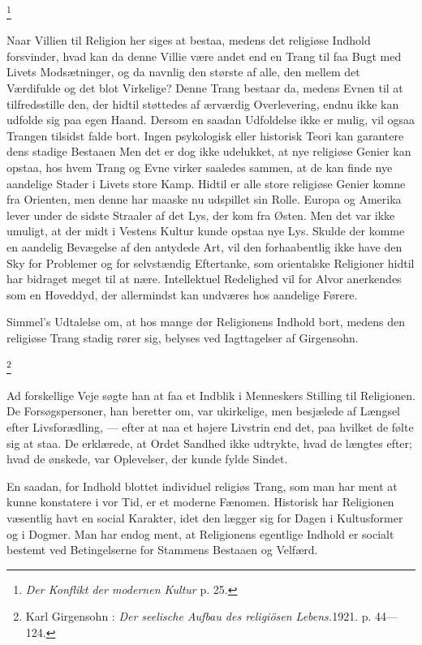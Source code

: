 \documentclass[12pt]{article}
\newcommand{\apage}[1]{\marginnote{\footnotesize\textit{[#1]}}}
\begin{document}
         \footnote{\textit{Der Konflikt der modernen Kultur} p. 25.}

       Naar Villien til Religion her siges at bestaa, medens det religiøse
Indhold forsvinder, hvad kan da denne Villie være andet end en Trang til faa
Bugt med Livets Modsætninger, og da navnlig den største af alle, den mellem det
Værdifulde og det blot Virkelige? Denne Trang bestaar da, medens Evnen til at
tilfredsstille den, der hidtil støttedes af ærværdig Overlevering, endnu ikke
kan udfolde sig paa egen Haand. Dersom en saadan Udfoldelse ikke er mulig, vil
ogsaa Trangen tilsidst falde bort. Ingen psykologisk eller historisk Teori kan
garantere dens stadige Bestaaen Men det er dog ikke udelukket, at nye religiøse
Genier kan opstaa, hos hvem Trang og Evne virker saaledes sammen, at de kan
finde nye aandelige Stader i Livets store Kamp. Hidtil er alle store religiøse
Genier komne fra Orienten, men denne har maaske nu udspillet sin Rolle. Europa
og Amerika lever under de sidste Straaler af det Lys, der kom fra Østen. Men
det var ikke umuligt, at der midt i Vestens Kultur kunde opstaa nye Lys. Skulde
der komme en aandelig Bevægelse af den antydede Art, vil den forhaabentlig ikke
have den Sky for Problemer og for selvstændig Eftertanke, som orientalske
Religioner hidtil har bidraget meget
\setcounter{footnote}{0}%
\apage{106}til at nære. Intellektuel Redelighed vil for Alvor anerkendes som en
Hoveddyd, der allermindst kan undværes hos aandelige Førere.

Simmel's Udtalelse om, at hos mange dør Religionens Indhold bort, medens den
religiøse Trang stadig rører sig, belyses ved Iagttagelser af Girgensohn.

         \footnote{Karl Girgensohn : \textit{Der seelische Aufbau des
religiösen Lebens.}1921. p. 44---124.}

       Ad forskellige Veje søgte han at faa et Indblik i Menneskers Stilling
til Religionen. De Forsøgspersoner, han beretter om, var ukirkelige, men
besjælede af Længsel efter \guillemotright{}Livsforædling\guillemotleft{}, ---
efter at naa et højere Livstrin end det, paa hvilket de følte sig at staa. De
erklærede, at Ordet Sandhed ikke udtrykte, hvad de længtes efter; hvad de
ønskede, var Oplevelser, der kunde fylde Sindet.

En saadan, for Indhold blottet individuel religiøs Trang, som man har ment at
kunne konstatere i vor Tid, er et moderne Fænomen. Historisk har Religionen
væsentlig havt en social Karakter, idet den lægger sig for Dagen i Kultusformer
og i Dogmer. Man har endog ment, at Religionens egentlige Indhold er socialt
bestemt ved Betingelserne for Stammens Bestaaen og Velfærd.
\end{document}
